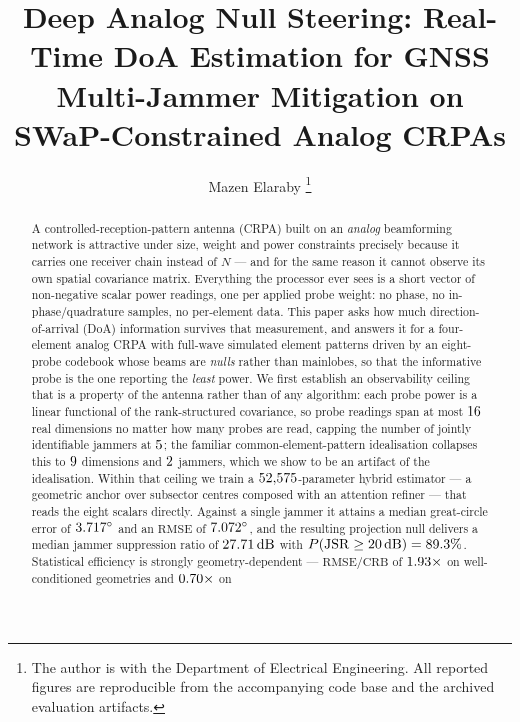 \documentclass[journal]{IEEEtran}
\newcommand{\JSR}{\mathrm{JSR}}
\newcommand{\CRB}{\mathrm{CRB}}
\newcommand{\RMSE}{\mathrm{RMSE}}
\newcommand{\dB}{\,\mathrm{dB}}
\newcommand{\degs}{^\circ}
\begin{document}
\title{Deep Analog Null Steering: Real-Time DoA Estimation for GNSS
Multi-Jammer Mitigation on SWaP-Constrained Analog CRPAs}

\author{Mazen Elaraby%
\thanks{The author is with the Department of Electrical Engineering. All
reported figures are reproducible from the accompanying code base and the
archived evaluation artifacts.}}

\maketitle

\begin{abstract}
A controlled-reception-pattern antenna (CRPA) built on an \emph{analog}
beamforming network is attractive under size, weight and power constraints
precisely because it carries one receiver chain instead of $N$ --- and for the
same reason it cannot observe its own spatial covariance matrix. Everything the
processor ever sees is a short vector of non-negative scalar power readings, one
per applied probe weight: no phase, no in-phase/quadrature samples, no
per-element data. This paper asks how much direction-of-arrival (DoA)
information survives that measurement, and answers it for a four-element
analog CRPA with full-wave simulated element patterns driven by an eight-probe
codebook
whose beams are \emph{nulls} rather than mainlobes, so that the informative
probe is the one reporting the \emph{least} power. We first establish an
observability ceiling that is a property of the antenna rather than of any
algorithm: each probe power is a linear functional of the rank-structured
covariance, so probe readings span at most $16$ real dimensions no matter
how many probes are read, capping the number of jointly identifiable jammers
at $5$; the familiar common-element-pattern idealisation collapses this
to $9$ dimensions and $2$ jammers, which we show to be an
artifact of the idealisation. Within that ceiling we train a
$52{,}575$-parameter hybrid
estimator --- a geometric anchor over subsector centres composed with an
attention refiner --- that reads the eight scalars directly. Against a single
jammer it attains a median great-circle error of $\netArcPfifty\degs$ and an
$\RMSE$ of $\netArcRmse\degs$, and the resulting projection null delivers a
median jammer suppression ratio of $\jsrMed\dB$ with
$P(\JSR \ge 20\dB) = \pJsrTwenty\%$.
Statistical efficiency is strongly geometry-dependent --- $\RMSE/\CRB$ of
$1.93\times$ on well-conditioned geometries and $0.70\times$ on

\end{abstract}
\end{document}
